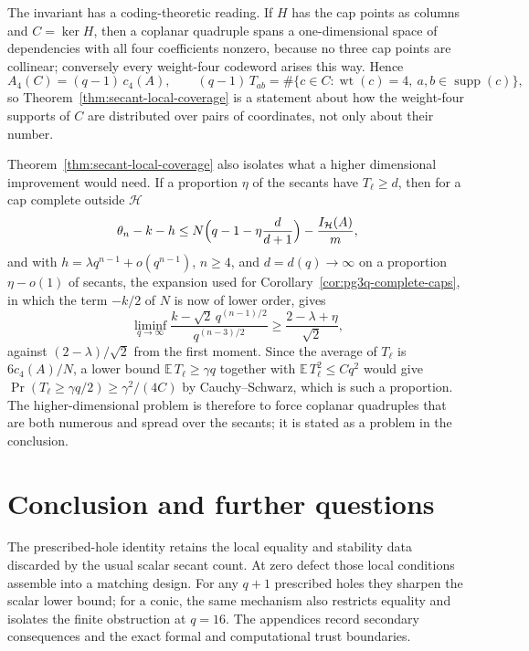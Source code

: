 \documentclass[11pt]{article}
\theoremstyle{definition}
\theoremstyle{remark}
\newcommand{\cH}{\mathcal{H}}
\newcommand{\IH}{I_{\cH}}
\begin{document}
The invariant has a coding-theoretic reading.  If $H$ has the cap points
as columns and $C=\ker H$, then a coplanar quadruple spans a
one-dimensional space of dependencies with all four coefficients nonzero,
because no three cap points are collinear; conversely every weight-four
codeword arises this way.  Hence
\[
 A_4(C)=(q-1)\,c_4(A),
 \qquad
 (q-1)\,T_{ab}=\#\{c\in C:\operatorname{wt}(c)=4,\ a,b\in\operatorname{supp}(c)\},
\]
so Theorem~\ref{thm:secant-local-coverage} is a statement about how the
weight-four supports of $C$ are distributed over pairs of coordinates,
not only about their number.

Theorem~\ref{thm:secant-local-coverage} also isolates what a higher
dimensional improvement would need.  If a proportion $\eta$ of the secants
have $T_\ell\ge d$, then for a cap complete outside $\cH$
\[
 \theta_n-k-h\le N\Bigl(q-1-\eta\frac{d}{d+1}\Bigr)-\frac{\IH(A)}m,
\]
and with $h=\lambda q^{n-1}+o(q^{n-1})$, $n\ge4$, and $d=d(q)\to\infty$
on a proportion $\eta-o(1)$ of secants, the expansion used for
Corollary~\ref{cor:pg3q-complete-caps}, in which the term $-k/2$ of $N$
is now of lower order, gives
\[
 \liminf_{q\to\infty}\frac{k-\sqrt2\,q^{(n-1)/2}}{q^{(n-3)/2}}
 \ge\frac{2-\lambda+\eta}{\sqrt2},
\]
against $(2-\lambda)/\sqrt2$ from the first moment.  Since the average of
$T_\ell$ is $6c_4(A)/N$, a lower bound $\mathbb E\,T_\ell\ge\gamma q$
together with $\mathbb E\,T_\ell^2\le Cq^2$ would give
$\Pr(T_\ell\ge\gamma q/2)\ge\gamma^2/(4C)$ by Cauchy--Schwarz, which is
such a proportion.  The higher-dimensional problem is therefore to force
coplanar quadruples that are both numerous and spread over the secants;
it is stated as a problem in the conclusion.

\section{Conclusion and further questions}

The prescribed-hole identity retains the local equality and stability data
discarded by the usual scalar secant count.  At zero defect those local
conditions assemble into a matching design.  For any \(q+1\) prescribed
holes they sharpen the scalar lower bound; for a conic, the same mechanism
also restricts equality and isolates the finite obstruction at \(q=16\).
The appendices record secondary consequences and the exact formal and
computational trust boundaries.
\end{document}
